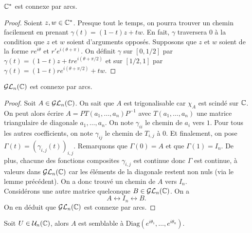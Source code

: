 \documentclass[../main.tex]{subfiles}
\begin{document}
\begin{lemma} \(\mathbb{C}^*\) est connexe par arcs.
\end{lemma}
\begin{proof}
    Soient \(z,w\in \mathbb{C}^*\). Presque tout le temps, on pourra trouver un chemin facilement en prenant \(\gamma(t) = (1-t)z + tw\). En fait, \(\gamma\) traversera \(0\)
    à la condition que \(z\) et \(w\) soient d'arguments opposés. Supposons que \(z\) et \(w\) soient de la forme \(re^{i\theta}\) et \(r'e^{i(\theta+\pi)}\).
    On définit \(\gamma\) sur \([0,1/2]\) par \(\gamma(t) = (1-t)z + tre^{i(\theta+\pi/2)}\) et sur \([1/2,1]\) par \(\gamma(t) = (1-t)re^{i(\theta+\pi/2)} + tw\). 
\end{proof}
\begin{proposition} \(\mathcal{GL}_n(\mathbb{C})\) est connexe par arcs.
\end{proposition}
\begin{proof}
    Soit \(A\in\mathcal{GL}_n(\mathbb{C})\). On sait que \(A\) est trigonalisable car \(\chi_A\) est scindé sur \(\mathbb{C}\).
    On peut alors écrire \(A = PT(a_1,\ldots,a_n)P^{-1}\) avec \(T(a_1,\ldots,a_n)\) une matrice triangulaire de diagonale \(a_1,\ldots,a_n\).
    On note \(\gamma_{ii}\) le chemin de \(a_i\) vers \(1\). Pour tous les autres coefficients, on note \(\gamma_{ij}\) le chemin de \(T_{i,j}\) à \(0\). Et finalement, on pose \(\Gamma(t) = (\gamma_{i,j}(t))_{i,j}\).
    Remarquons que \(\Gamma(0)= A\) et que \(\Gamma(1)=I_n\). De plus, chacune des fonctions composites \(\gamma_{i,j}\) est continue donc \(\Gamma\) est continue, à valeurs dans 
    \(\mathcal{GL}_n(\mathbb{C})\) car les éléments de la diagonale restent non nuls (via le lemme précédent). On a donc trouvé un chemin de \(A\) vers \(I_n\).\\

    Considérons une autre matrice quelconque \(B\in\mathcal{GL}_n(\mathbb{C})\). On a 
    \begin{equation}
        A \longleftrightarrow I_n \longleftrightarrow B.
    \end{equation}
    On en déduit que \(\mathcal{GL}_n(\mathbb{C})\) est connexe par arcs.
\end{proof}
\begin{lemma} Soit \(U \in \mathcal{U}_n(\mathbb{C})\), alors \(A\) est semblable à \(\mathrm{Diag}(e^{i\theta_1},\ldots,e^{i\theta_n})\).
\end{lemma}
\end{document}
